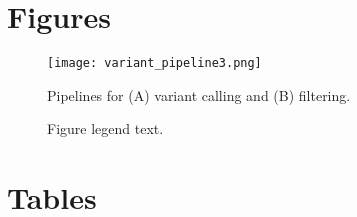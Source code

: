\documentclass{bmcart}
\begin{document}
\begin{backmatter}

\newpage
\section*{Figures}

\begin{figure}[h!]
\centering
	\texttt{[image: variant\_pipeline3.png]}
	\caption{Pipelines for (A) variant calling and (B) filtering.}
	\label{variant_pipeline}
\end{figure}

\begin{figure}[h!]
  \caption{
      Figure legend text.}
      \end{figure}




\section*{Tables}


\end{backmatter}
\end{document}
